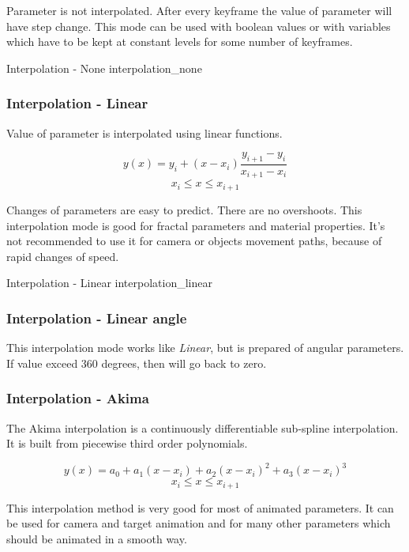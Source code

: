 Parameter is not interpolated. After every keyframe the value of parameter will
have step change. This mode can be used with boolean values or with variables
which have to be kept at constant levels for some number of keyframes.

{Interpolation - None}
{interpolation_none}

\subsubsection{Interpolation - Linear}\label{interpolation-linear}

Value of parameter is interpolated using linear functions.

\[ y(x) = y_i + (x - x_i) \frac{y_{i+1} - y_i}{x_{i+1} - x_i}\] \[x_i  \leq x
\leq x_{i+1}\]

Changes of parameters are easy to predict. There are no overshoots. This
interpolation mode is good for fractal parameters and material properties. It's
not recommended to use it for camera or objects movement paths, because of rapid
changes of speed.

{Interpolation - Linear}
{interpolation_linear}

\subsubsection{Interpolation - Linear angle}\label{interpolation-linear-angle}

This interpolation mode works like \emph{Linear}, but is prepared of angular
parameters. If value exceed 360 degrees, then will go back to zero.

\subsubsection{Interpolation - Akima}\label{interpolation-akima}

The Akima interpolation is a continuously differentiable sub-spline
interpolation. It is built from piecewise third order polynomials.

\[ y(x) = a_0 + a_1 (x - x_i) + a_2 (x - x_i)^2 + a_3 (x - x_i)^3\] \[x_i  \leq
x \leq x_{i+1}\]

This interpolation method is very good for most of animated parameters. It can
be used for camera and target animation and for many other parameters which
should be animated in a smooth way.

